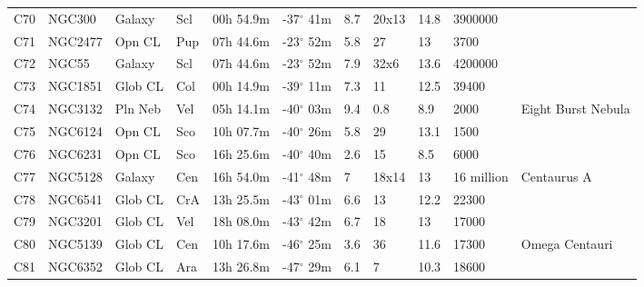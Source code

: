 \documentclass[10pt,twoside,a4paper,english]{article}
\begin{document}
\begin{longtable}{@{}lllllllllll@{}}
C70        & NGC300      & Galaxy     & Scl       & 00h 54.9m & -37$^{\circ}$ 41m  & 8.7       & 20x13                & 14.8     & 3900000             &                                 \\ 
C71        & NGC2477     & Opn CL     & Pup       & 07h 44.6m & -23$^{\circ}$ 52m  & 5.8       & 27                   & 13       & 3700                &                                 \\ 
C72        & NGC55       & Galaxy     & Scl       & 07h 44.6m & -23$^{\circ}$ 52m  & 7.9       & 32x6                 & 13.6     & 4200000             &                                 \\ 
C73        & NGC1851     & Glob CL    & Col       & 00h 14.9m & -39$^{\circ}$ 11m  & 7.3       & 11                   & 12.5     & 39400               &                                 \\ 
C74        & NGC3132     & Pln Neb    & Vel       & 05h 14.1m & -40$^{\circ}$ 03m  & 9.4       & 0.8                  & 8.9      & 2000                & Eight Burst Nebula              \\ 
C75        & NGC6124     & Opn CL     & Sco       & 10h 07.7m & -40$^{\circ}$ 26m  & 5.8       & 29                   & 13.1     & 1500                &                                 \\ 
C76        & NGC6231     & Opn CL     & Sco       & 16h 25.6m & -40$^{\circ}$ 40m  & 2.6       & 15                   & 8.5      & 6000                &                                 \\ 
C77        & NGC5128     & Galaxy     & Cen       & 16h 54.0m & -41$^{\circ}$ 48m  & 7         & 18x14                & 13       & 16 million          & Centaurus A                     \\ 
C78        & NGC6541     & Glob CL    & CrA       & 13h 25.5m & -43$^{\circ}$ 01m  & 6.6       & 13                   & 12.2     & 22300               &                                 \\ 
C79        & NGC3201     & Glob CL    & Vel       & 18h 08.0m & -43$^{\circ}$ 42m  & 6.7       & 18                   & 13       & 17000               &                                 \\ 
C80        & NGC5139     & Glob CL    & Cen       & 10h 17.6m & -46$^{\circ}$ 25m  & 3.6       & 36                   & 11.6     & 17300               & Omega Centauri                  \\ 
C81        & NGC6352     & Glob CL    & Ara       & 13h 26.8m & -47$^{\circ}$ 29m  & 6.1       & 7                    & 10.3     & 18600               &                                 \\ 

\end{longtable}
\end{document}
